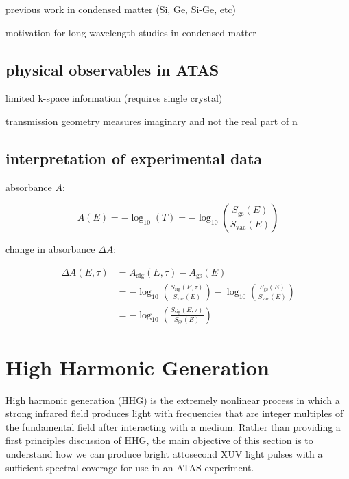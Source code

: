 previous work in condensed matter (Si, Ge, Si-Ge, etc)

motivation for long-wavelength studies in condensed matter

\subsection{physical observables in ATAS}
limited k-space information (requires single crystal)

transmission geometry measures imaginary and not the real part of n

\subsection{interpretation of experimental data}

absorbance $A$:

\begin{equation}
A(E) = - \log_{10} (T) = -\log_{10} \left( \frac{S_{\textrm{gs}}(E)}{ S_{\textrm{vac}} (E)} \right)
\label{eqn:absorbance}
\end{equation}

change in absorbance $\Delta A$:

\begin{align}
\Delta A (E, \tau) &= A_{\textrm{sig}}(E,\tau) - A_{\textrm{gs}} (E) \nonumber \\
&= -\log_{10} \left( \frac{S_{\textrm{sig}}(E, \tau)}{ S_{\textrm{vac}} (E)} \right) -\log_{10} \left( \frac{S_{\textrm{gs}}(E)}{ S_{\textrm{vac}} (E)} \right) \nonumber \\
&= -\log_{10} \left( \frac{S_{\textrm{sig}} (E, \tau)}{ S_{\textrm{gs}} (E)} \right)
\end{align}

\section{High Harmonic Generation}

\label{sec:HHG}

High harmonic generation (HHG) is the extremely nonlinear process in which a strong infrared field produces light with frequencies that are integer multiples of the fundamental field after interacting with a medium. Rather than providing a first principles discussion of HHG, the main objective of this section is to understand how we can produce bright attosecond XUV light pulses with a sufficient spectral coverage for use in an ATAS experiment.


